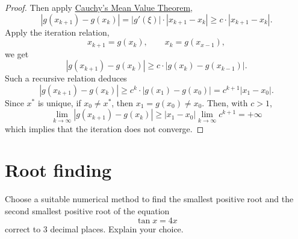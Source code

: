 \begin{enumerate}
\begin{proof}
	Then apply \hyperref[cauchymean]{Cauchy's Mean Value Theorem},
	\[ |g(x_{k+1})-g(x_k)|=|g'(\xi)|\cdot|x_{k+1}-x_k|\geq c\cdot|x_{k+1}-x_k|. \]
	Apply the iteration relation,
	\[ x_{k+1}=g(x_k), \qquad x_k=g(x_{x-1}), \]
	we get
	\[ |g(x_{k+1})-g(x_k)|\geq c\cdot|g(x_k)-g(x_{k-1})|. \]
	Such a recursive relation deduces
	\[ |g(x_{k+1})-g(x_k)|\geq c^k\cdot|g(x_1)-g(x_0)|=c^{k+1}|x_1-x_0|. \]
	Since \(x^*\) is unique, if \(x_0\neq x^*\), then \(x_1=g(x_0)\neq x_0\).
	Then, with \(c>1\),
	\[ \lim_{k\to\infty}|g(x_{k+1})-g(x_k)|\geq |x_1-x_0|\lim_{k\to\infty} c^{k+1}=+\infty \]
	which implies that the iteration does not converge.
	\end{proof}
\end{enumerate}


\section{Root finding}
Choose a suitable numerical method to find the smallest positive root and the second smallest positive root of the equation
\[ \tan x = 4x \]
correct to 3 decimal places.
Explain your choice.
